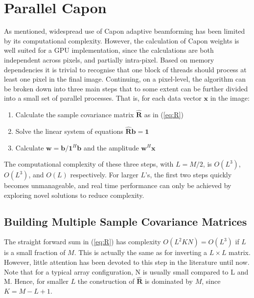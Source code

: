 \documentclass[journal]{IEEEtran}
\newcommand{\mat}[1]{\mathbf{#1}}
\renewcommand{\vec}[1]{\mathbf{#1}}
\begin{document}


\section{Parallel Capon}\label{sec:meth}
As mentioned, widespread use of Capon adaptive beamforming has been limited by its computational complexity. However, the calculation of Capon weights is well suited for a GPU implementation, since the calculations are both independent across pixels, and partially intra-pixel. Based on memory dependencies it is trivial to recognise that one block of threads should process at least one pixel in the final image. Continuing, on a pixel-level, the algorithm can be broken down into three main steps that to some extent can be further divided into a small set of parallel processes. That is, for each data vector $\vec{x}$ in the image:
\begin{enumerate}
\item Calculate the sample covariance matrix $\mat{\hat{R}}$ as in (\ref{eq:R})
\item Solve the linear system of equations $\mat{\hat{R}}\vec{b} =\vec{ 1}$
\item Calculate $\vec{w} = \vec{b}/\vec{1}^H\vec{b}$ and the amplitude $\vec{w}^H\vec{x}$
\end{enumerate}
The computational complexity of these three steps, with $L = M/2$, is $O(L^3)$, $O(L^3)$, and $O(L)$ respectively. For larger $L$'s, the first two steps quickly becomes unmanageable, and real time performance can only be achieved by exploring novel solutions to reduce complexity. 

\subsection{Building Multiple Sample Covariance Matrices}
The straight forward sum in (\ref{eq:R}) has complexity $O(L^2KN) = O(L^3)$ if $L$ is a small fraction of $M$. This is actually the same as for inverting a $L \times L$ matrix. However, little attention has been devoted to this step in the literature until now. Note that for a typical array configuration, N is usually small compared to L and M. Hence, for smaller $L$ the construction of $\mat{\hat{R}}$ is dominated by $M$, since $K = M - L + 1$. 
\end{document}

